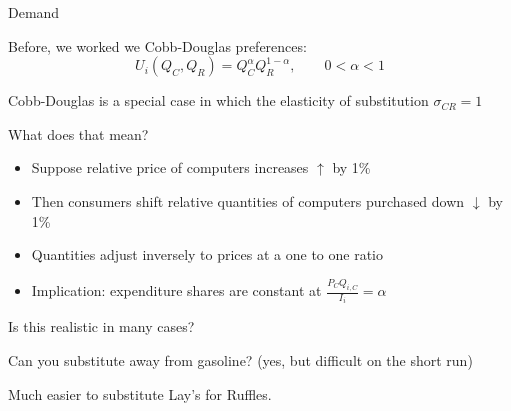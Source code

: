 \documentclass[notes,11pt, aspectratio=169, xcolor=table]{beamer}
\newenvironment{wideitemize}{\itemize\addtolength{\itemsep}{10pt}}{\enditemize}
\begin{document}
\begin{frame}{Demand}
    \begin{wideitemize}
        \item Before, we worked we Cobb-Douglas preferences:
        \begin{equation*}
            U_i(Q_C,Q_R) = Q_C^{\alpha} Q_R^{1-\alpha}, \qquad 0 < \alpha < 1
        \end{equation*}

        \item<2-> Cobb-Douglas is a special case in which the elasticity of substitution $\sigma_{CR} = 1$

        \item<3-> What does that mean?
        \begin{itemize}
            \item Suppose relative price of computers increases $\uparrow$ by 1\% 
            \item Then consumers shift relative quantities of computers purchased down $\downarrow$ by 1\% 
            \item Quantities adjust inversely to prices at a one to one ratio 
            \item Implication: expenditure shares are constant at $\frac{P_C Q_{i,C}}{I_i} = \alpha$ 
        \end{itemize}

        \item<4-> Is this realistic in many cases?

        \item<5-> Can you substitute away from gasoline?
        (yes, but difficult on the short run)

        \item<6-> Much easier to substitute Lay's for Ruffles.

    \end{wideitemize}    
\end{frame}
\end{document}
